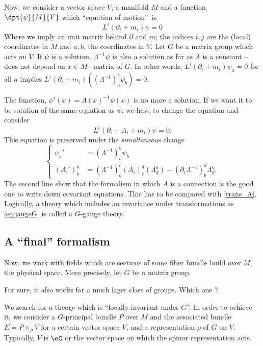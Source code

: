 Now, we consider a vector space $V$, a manifold $M$ and a function $\dpt{\psi}{M}{V}$ which ``equation of motion''\ is
\[
   L^i(\partial_i+m_i)\psi=0
\]
Where we imply an unit matrix behind $\partial$ and $m$; the indices $i,j$ are the (local) coordinates in $M$ and $a,b$, the coordinates in $V$. Let $G$ be a matrix group which acts on $V$. If $\psi$ is a solution, $\Lambda^{-1}\psi$ is also a solution as far as $\Lambda$ is a constant --does not depend on $x\in M$-- matrix of $G$. In other words, $L^i(\partial_i+m_i)\psi_a=0$ for all $a$ implies $L^i(\partial_i+m_i)((\Lambda^{-1})^b_a\psi_b)=0$.

The function, $\psi'(x)=\Lambda(x)^{-1}\psi(x)$ is no more a solution. If we want it to be solution of the same equation as $\psi$, we have to change the equation and consider
\[
   L^i(\partial_i+A_i+m_i)\psi=0.
\]
This equation is preserved under the \emph{simultaneous} change
\begin{equation}\label{eq:jaugeG}
    \left\{\begin{aligned}
	   \psi_a'&=(\Lambda^{-1})^b_a\psi_b\\
           (A_i')^a_b&=(\Lambda^{-1})^c_b (A_i)^d_c(\Lambda^a_d)-(\partial_i\Lambda^{-1})^d_b\Lambda^a_d.
          \end{aligned}\right.
\end{equation}
The second line show that the formalism in which $A$ is a connection is the good one to write down covariant equations. This has to be compared with \eqref{trans_A}. Logically, a theory which includes an invariance under transformations as \eqref{eq:jaugeG} is called a $G$-gauge theory.

\subsection{A ``final'' formalism}

Now, we work with fields which are sections of some fiber bundle build over $M$, the physical space. More precisely, let $G$ be a matrix group. 

\begin{probleme}
	For sure, it also works for a much lager class of groups. Which one ?
\end{probleme}


We search for a theory which is ``locally invariant under $G$''. In order to achieve it, we consider a $G$-principal bundle $P$ over $M$ and the associated bundle $E=P\times_{\rho}V$ for a certain vector space $V$, and a representation $\rho$ of $G$ on $V$. Typically, $V$ is $\eC$ or the vector space on which the spinor representation acts.

